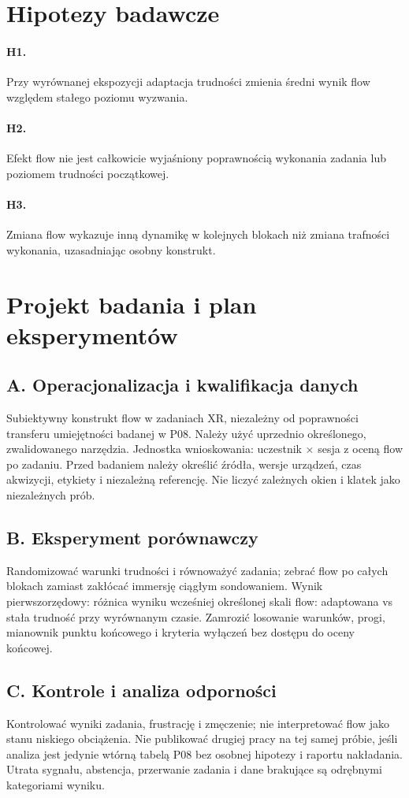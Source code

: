 \documentclass[11pt,a4paper]{article}
\begin{document}
\section{Hipotezy badawcze}
\paragraph{H1.} Przy wyrównanej ekspozycji adaptacja trudności zmienia średni wynik flow względem stałego poziomu wyzwania.
\paragraph{H2.} Efekt flow nie jest całkowicie wyjaśniony poprawnością wykonania zadania lub poziomem trudności początkowej.
\paragraph{H3.} Zmiana flow wykazuje inną dynamikę w kolejnych blokach niż zmiana trafności wykonania, uzasadniając osobny konstrukt.
\section{Projekt badania i plan eksperymentów}
\subsection{A. Operacjonalizacja i kwalifikacja danych}
Subiektywny konstrukt flow w zadaniach XR, niezależny od poprawności transferu umiejętności badanej w P08. Należy użyć uprzednio określonego, zwalidowanego narzędzia. Jednostka wnioskowania: uczestnik × sesja z oceną flow po zadaniu. Przed badaniem należy określić źródła, wersje urządzeń, czas akwizycji, etykiety i niezależną referencję. Nie liczyć zależnych okien i klatek jako niezależnych prób.
\subsection{B. Eksperyment porównawczy}
Randomizować warunki trudności i równoważyć zadania; zebrać flow po całych blokach zamiast zakłócać immersję ciągłym sondowaniem. Wynik pierwszorzędowy: różnica wyniku wcześniej określonej skali flow: adaptowana vs stała trudność przy wyrównanym czasie. Zamrozić losowanie warunków, progi, mianownik punktu końcowego i kryteria wyłączeń bez dostępu do oceny końcowej.
\subsection{C. Kontrole i analiza odporności}
Kontrolować wyniki zadania, frustrację i zmęczenie; nie interpretować flow jako stanu niskiego obciążenia. Nie publikować drugiej pracy na tej samej próbie, jeśli analiza jest jedynie wtórną tabelą P08 bez osobnej hipotezy i raportu nakładania. Utrata sygnału, abstencja, przerwanie zadania i dane brakujące są odrębnymi kategoriami wyniku.
\end{document}
